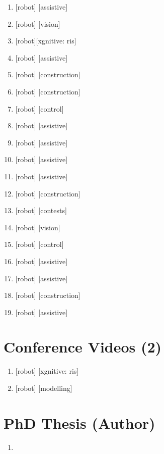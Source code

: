 \documentclass{article}
\begin{document}
\begin{enumerate}
  \item {} [robot] [assistive]
  \item {} [robot] [vision]
  \item {} [robot][xgnitive: ris]
  \item {} [robot]  [assistive]
  \item {} [robot] [construction]
  \item {} [robot] [construction]
  \item {} [robot] [control]
  \item {} [robot] [assistive]
  \item {} [robot] [assistive]
  \item {} [robot] [assistive]
  \item {} [robot] [assistive]
  \item {} [robot] [construction]
  \item {} [robot] [contests]
  \item {} [robot] [vision]
  \item {} [robot] [control]
  \item {} [robot] [assistive]
  \item {} [robot] [assistive]
  \item {} [robot] [construction]
  \item {} [robot] [assistive]
\end{enumerate}

\section*{Conference Videos (2)}
\begin{enumerate}
  \item {} [robot] [xgnitive: ris]
  \item {} [robot] [modelling]
\end{enumerate}

\section*{PhD Thesis (Author)}
\begin{enumerate}
  \item {}
\end{enumerate}
\end{document}
